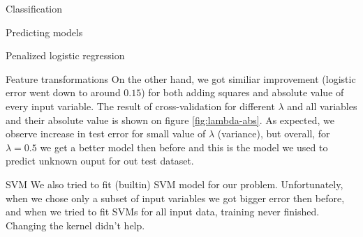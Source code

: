 \documentclass{article}
\begin{document}
\begin{section}{Classification}
\begin{subsection}{Predicting models}
\begin{subsubsection}{Penalized logistic regression}
\begin{subsubsection}{Feature transformations}
On the other hand, we got similiar improvement (logistic error went down to around $0.15$) for both adding squares and absolute value of every input variable. The result of cross-validation for different $\lambda$ and all variables and their absolute value is shown on figure \ref{fig:lambda-abs}. As expected, we observe increase in test error for small value of $\lambda$ (variance), but overall, for $\lambda = 0.5$ we get a better model then before and this is the model we used to predict unknown ouput for out test dataset.
\end{subsubsection}
\end{subsubsection}
\begin{subsubsection}{SVM}
We also tried to fit (builtin) SVM model for our problem. Unfortunately, when we chose only a subset of input variables we got bigger error then before, and when we tried to fit SVMs for all input data, training never finished. Changing the kernel didn't help.
\end{subsubsection}
\end{subsection}
\end{section}
\end{document}
